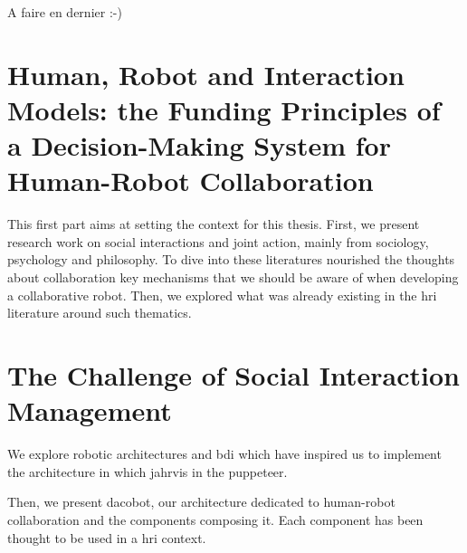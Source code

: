 \documentclass[english,a4paper,11pt,twoside]{StyleThese}
\begin{document}
A faire en dernier :-) 

\tableofcontents

\printnoidxglossary[type=\acronymtype]
%



\mainmatter
{}

\fancyhead[RE]{\bfseries\nouppercase{\leftmark}}      %
\fancyhead[LO]{\bfseries\nouppercase{\rightmark}}     %

\part{Human, Robot and Interaction Models: the Funding Principles of a Decision-Making System for Human-Robot Collaboration}\label{part:part1}
\begin{partintro}
	This first part aims at setting the context for this thesis. First, we present research work on social interactions and joint action, mainly from sociology, psychology and philosophy. To dive into these literatures nourished the thoughts about collaboration key mechanisms that we should be aware of when developing a collaborative robot. Then, we explored what was already existing in the \acrlong{hri} literature around such thematics.
\end{partintro}


\part{The Challenge of Social Interaction Management}\label{part:part2}
\begin{partintro}
	We explore robotic architectures and \acrfull{bdi} which have inspired us to implement the architecture in which \acrshort{jahrvis} in the puppeteer.
	
	Then, we present \acrfull{dacobot}, our architecture dedicated to human-robot collaboration and the components composing it. Each component has been thought to be used in a \acrshort{hri} context.
\end{partintro}	


\end{document}
